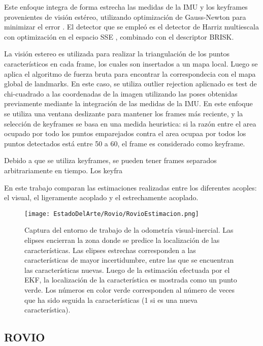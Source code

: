 Este enfoque integra de forma estrecha las medidas de la IMU y los keyframes provenientes de visión estéreo, utilizando optimización de Gauss-Newton para minimizar el error . El detector que se empleó es el detector de Harriz multiescala con optimización en el espacio SSE , combinado con el descriptor BRISK. 

La visión estereo es utilizada para realizar la triangulación de los puntos característicos en cada frame, los cuales son insertados a un mapa local. Luego se aplica el algoritmo de fuerza bruta para encontrar la correspondecia con el mapa global de landmarks. En este caso, se utiliza outlier rejection aplicnado es test de chi-cuadrado a las coordenadas de la imagen utilizando las poses obtenidas previamente mediante la integración de las medidas de la IMU.
En este enfoque se utiliza una ventana deslizante para mantener los frames más reciente, y la selección de keyframes se basa en una medida heuristica: si la razón entre el area ocupado por todo los puntos emparejados contra el area ocupaa por todos los puntos detectados está entre 50 a 60, el frame es considerado como keyframe.



Debido a que se utiliza keyframes, se pueden tener frames separados arbitrariamente en tiempo. Los keyfra

En este trabajo comparan las estimaciones realizadas entre los diferentes acoples: el visual, el ligeramente acoplado y el estrechamente acoplado.






\begin{figure}[H]
	\centering
	\texttt{[image: EstadoDelArte/Rovio/RovioEstimacion.png]}
	\caption{Captura del entorno de trabajo de la odometría visual-inercial. Las elipses encierran la zona donde se predice la localización de las características. Las elipses estrechas corresponden a las características de mayor incertidumbre, entre las que se encuentran las características nuevas. Luego de la estimación efectuada por el EKF, la localización de la característica es mostrada como un punto verde. Los números en color verde corresponden al número de veces que ha sido seguida la características (1 si es una nueva característica).}
	\label{fig:OkvisResultados}
\end{figure}

\subsection{ROVIO}

